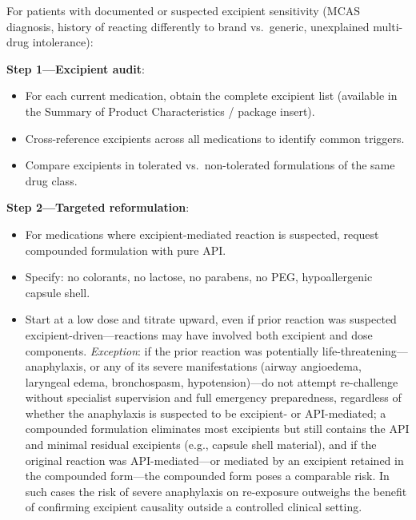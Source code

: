 \begin{directive}
\label{dir:excipient-protocol}
For patients with documented or suspected excipient sensitivity (MCAS diagnosis, history of reacting differently to brand vs.\ generic, unexplained multi-drug intolerance):

\textbf{Step 1---Excipient audit}:
\begin{itemize}
    \item For each current medication, obtain the complete excipient list (available in the Summary of Product Characteristics / package insert).
    \item Cross-reference excipients across all medications to identify common triggers.
    \item Compare excipients in tolerated vs.\ non-tolerated formulations of the same drug class.
\end{itemize}

\textbf{Step 2---Targeted reformulation}:
\begin{itemize}
    \item For medications where excipient-mediated reaction is suspected, request compounded formulation with pure API.
    \item Specify: no colorants, no lactose, no parabens, no PEG, hypoallergenic capsule shell.
    \item Start at a low dose and titrate upward, even if prior reaction was suspected excipient-driven---reactions may have involved both excipient and dose components. \textit{Exception}: if the prior reaction was potentially life-threatening---anaphylaxis, or any of its severe manifestations (airway angioedema, laryngeal edema, bronchospasm, hypotension)---do not attempt re-challenge without specialist supervision and full emergency preparedness, regardless of whether the anaphylaxis is suspected to be excipient- or API-mediated; a compounded formulation eliminates most excipients but still contains the API and minimal residual excipients (e.g., capsule shell material), and if the original reaction was API-mediated---or mediated by an excipient retained in the compounded form---the compounded form poses a comparable risk. In such cases the risk of severe anaphylaxis on re-exposure outweighs the benefit of confirming excipient causality outside a controlled clinical setting.
\end{itemize}


\end{directive}
